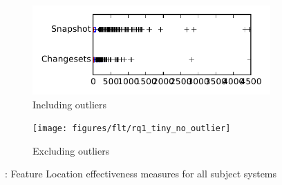 
\begin{figure}
    \centering
    \begin{subfigure}{.4\textwidth}
        \centering
        \includegraphics[height=0.4\textheight]{figures/flt/rq1_tiny}
        \caption{Including outliers}\label{fig:flt:rq1:tiny_outlier}
    \end{subfigure}%
    \begin{subfigure}{.4\textwidth}
        \centering
        \texttt{[image: figures/flt/rq1\_tiny\_no\_outlier]}
        \caption{Excluding outliers}\label{fig:flt:rq1:tiny_no_outlier}
    \end{subfigure}
\caption{\fone: Feature Location effectiveness measures for all subject systems}
\label{fig:flt:rq1:tiny}
\end{figure}
